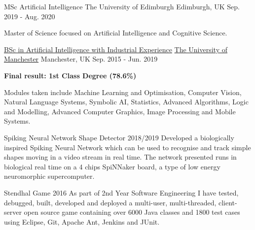\begin{cventries}
  \cventry
    {MSc Artificial Intelligence}
    {The University of Edimburgh}
    {Edimburgh, UK}
    {Sep. 2019 - Aug. 2020}
    {
      \begin{cvitems}
        \item {Master of Science focused on Artificial Intelligence and Cognitive Science.}
      \end{cvitems}
    }
    
  \cventry
    {\href{http://www.manchester.ac.uk/study/undergraduate/courses/2017/00517/bsc-artificial-intelligence/}{BSc in Artificial Intelligence with Industrial Experience}}
    {\href{www.manchester.ac.uk}{The University of Manchester}}
    {Manchester, UK}
    {Sep. 2015 - Jun. 2019}
    {
      \begin{cvitems}
        \item {\textbf{Final result: 1st Class Degree (78.6\%)}}
        \item {Modules taken include Machine Learning and Optimisation, Computer Vision, Natural Language Systems, Symbolic AI, Statistics, Advanced Algorithms, Logic and Modelling, Advanced Computer Graphics, Image Processing and Mobile Systems.}
      \end{cvitems}
    }
    \begin{cvsubentries}
      {Spiking Neural Network Shape Detector}
      {2018/2019}
      {Developed a biologically inspired Spiking Neural Network which can be used to recognise and track simple shapes moving in a video stream in real time. The network presented runs in biological real time on a 4 chips SpiNNaker board, a type of low energy neuromorphic supercomputer.}
    \end{cvsubentries}

    \begin{cvsubentries}
      {Stendhal Game}
      {2016}
      {As part of 2nd Year Software Engineering I have tested, debugged, built, developed and deployed a multi-user, multi-threaded, client-server open source game containing over 6000 Java classes and 1800 test cases using Eclipse, Git, Apache Ant, Jenkins and JUnit.}
    \end{cvsubentries}


\end{cventries}
